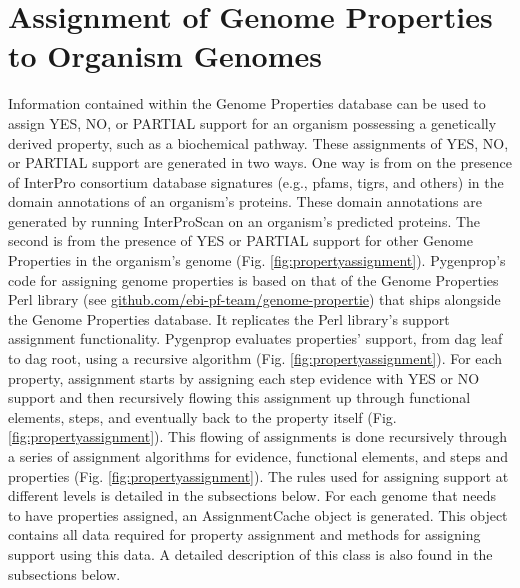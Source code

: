 \section{Assignment of Genome Properties to Organism Genomes}

Information contained within the Genome Properties database can be used to assign YES, NO, or PARTIAL support for an organism possessing a genetically derived property, such as a biochemical pathway. These assignments of YES, NO, or PARTIAL support are generated in two ways. One way is from on the presence of InterPro consortium database signatures (e.g., \gls{pfam}s, \gls{tigr}s,  and others) in the domain annotations of an organism's proteins. These domain annotations are generated by running InterProScan \cite{jones2014interproscan} on an organism's predicted proteins. The second is from the presence of YES or PARTIAL support for other Genome Properties in the organism's genome (Fig. \ref{fig:propertyassignment}). Pygenprop's code for assigning genome properties is based on that of the Genome Properties Perl library (see \href{http://github.com/ebi-pf-team/genome-properties}{github.com/ebi-pf-team/genome-propertie}) that ships alongside the Genome Properties database. It replicates the Perl library's support assignment functionality. Pygenprop evaluates properties' support, from \gls{dag} leaf to \gls{dag} root, using a recursive algorithm (Fig. \ref{fig:propertyassignment}). For each property, assignment starts by assigning each step evidence with YES or NO support and then recursively flowing this assignment up through functional elements, steps, and eventually back to the property itself (Fig. \ref{fig:propertyassignment}). This flowing of assignments is done recursively through a series of assignment algorithms for evidence, functional elements, and steps and properties (Fig. \ref{fig:propertyassignment}). The rules used for assigning support at different levels is detailed in the subsections below. For each genome that needs to have properties assigned, an AssignmentCache object is generated. This object contains all data required for property assignment and methods for assigning support using this data. A detailed description of this class is also found in the subsections below.

